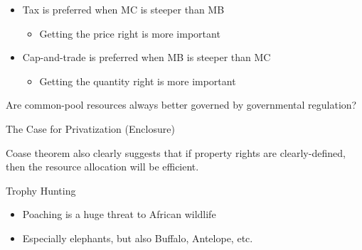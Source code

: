 \begin{frame}{}
\protect\hypertarget{section-25}{}

\begin{itemize}
\tightlist
\item
  Tax is preferred when MC is steeper than MB

  \begin{itemize}
  \tightlist
  \item
    Getting the price right is more important
  \end{itemize}
\item
  Cap-and-trade is preferred when MB is steeper than MC

  \begin{itemize}
  \tightlist
  \item
    Getting the quantity right is more important
  \end{itemize}
\end{itemize}

\end{frame}

\begin{frame}{Are common-pool resources always better governed by
governmental regulation?}
\protect\hypertarget{are-common-pool-resources-always-better-governed-by-governmental-regulation}{}

\end{frame}

\begin{frame}{The Case for Privatization (Enclosure)}
\protect\hypertarget{the-case-for-privatization-enclosure}{}

Coase theorem also clearly suggests that if property rights are
clearly-defined, then the resource allocation will be efficient.

\end{frame}

\begin{frame}{Trophy Hunting}
\protect\hypertarget{trophy-hunting}{}

\begin{itemize}
\tightlist
\item
  Poaching is a huge threat to African wildlife
\item
  Especially elephants, but also Buffalo, Antelope, etc.
\end{itemize}

\end{frame}

